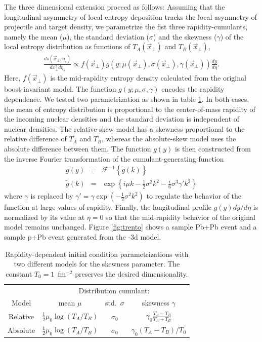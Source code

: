 \documentclass[3p,times,twocolumn]{elsarticle}
\begin{document}
The three dimensional extension proceed as  follows: 
Assuming that the longitudinal asymmetry of local entropy deposition tracks the local asymmetry of projectile and target density, we parametrize the fist three rapidity-cumulants, namely the mean ($\mu$), the standard deviation ($\sigma$) and the skewness ($\gamma$) of the local entropy distribution as functions of $T_A(\vec{x}_{\perp})$ and $T_B(\vec{x}_{\perp})$,
\begin{eqnarray}
\frac{ds(\vec{x}_{\perp}, \eta_s)}{dx_{\perp}^2 d\eta_s} \propto f(\vec{x}_{\perp})g(y; \mu(\vec{x}_{\perp}), \sigma(\vec{x}_{\perp}), \gamma(\vec{x}_{\perp}))\frac{dy}{d\eta}.
\end{eqnarray}
Here, $f(\vec{x}_{\perp})$ is the  mid-rapidity entropy density calculated from the original boost-invariant model. The function $g(y; \mu, \sigma, \gamma)$ encodes the rapidity dependence.
We tested two parametrization as shown in table \ref{tab:parametrization}.
In both cases, the mean of entropy distribution is proportional to the center-of-mass rapidity of the incoming nuclear densities and the standard deviation is independent of nuclear densities. 
The relative-skew model has a skewness proportional to the relative difference of $T_A$ and $T_B$, whereas the absolute-skew model uses the absolute difference between them.
The function $g(y)$ is then constructed from the inverse Fourier transformation of the cumulant-generating function
\begin{eqnarray}
g(y) &=& \mathcal{F}^{-1}\left\lbrace\tilde{g}(k)\right\rbrace \\
\tilde{g}(k) &=& \exp \left\lbrace i\mu k - \frac{1}{2}\sigma^2 k^2 - \frac{i}{6}\sigma^3 \gamma'k^3\right\rbrace
\end{eqnarray}
where $\gamma$ is replaced by $\gamma' = \gamma\exp(-\frac{1}{2}\sigma^2k^2)$ to regulate the behavior of the function at large values of rapidity.
Finally, the longitudinal profile $g(y)dy/d\eta$ is normalized by its value at $\eta=0$ so that the mid-rapidity behavior of the original model remains unchanged.
Figure \ref{fig:trento} shows a sample Pb+Pb event and a sample p+Pb event generated from the \trento-3d model.

\begin{table}
  \caption{
    \label{tab:parametrization}
    Rapidity-dependent initial condition parametrizations with two different models for the skewness parameter. The constant $T_0 = 1$~fm$^{-2}$ preserves the desired dimensionality.
  }
  \begin{tabular}{cccc}
\hline\hline
      & \multicolumn{3}{c}{Distribution cumulant:} \\
      Model & \multicolumn{1}{c}{mean $\mu$} & \multicolumn{1}{c}{std.\ $\sigma$} & \multicolumn{1}{c}{skewness $\gamma$} \\
\hline
        Relative  & $\frac{1}{2} \mu_0 \log(T_A/T_B)$ & $\sigma_0$ & $\gamma_0 \frac{T_A - T_B}{T_A + T_B}$ \smallskip \\
        Absolute & $\frac{1}{2} \mu_0 \log(T_A/T_B)$  & $\sigma_0$ & $\gamma_0 (T_A - T_B)/T_0$ \\
\hline\hline
  \end{tabular}
\end{table}
\end{document}
